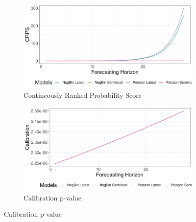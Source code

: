\begin{figure}[H]
\begin{subfigure}{0.5\textwidth}
  \centering
  \includegraphics[width=\linewidth]{../output/Mambasa_crps.png}  
  \caption{Contineously Ranked Probability Score}
  \label{fig:sub-first}
\end{subfigure}
\begin{subfigure}{0.5\textwidth}
  \centering
  \includegraphics[width=\linewidth]{../output/Mambasa_calibration.png}  
  \caption{Calibration p-value}
  \label{fig:sub-second}
\end{subfigure}


\end{figure}
